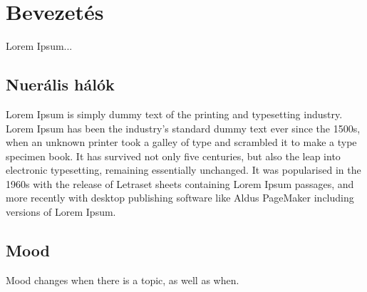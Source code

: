 \documentclass[12pt]{article}
\begin{document}
\section*{Bevezetés}

Lorem Ipsum...

\subsection*{Nuerális hálók}

Lorem Ipsum is simply dummy text of the printing and typesetting industry. Lorem Ipsum has been the industry's standard dummy text ever since the 1500s, when an unknown printer took a galley of type and scrambled it to make a type specimen book. It has survived not only five centuries, but also the leap into electronic typesetting, remaining essentially unchanged. It was popularised in the 1960s with the release of Letraset sheets containing Lorem Ipsum passages, and more recently with desktop publishing software like Aldus PageMaker including versions of Lorem Ipsum. 

\subsection*{Mood}

Mood changes when there is a topic, as well as when.
\end{document}
